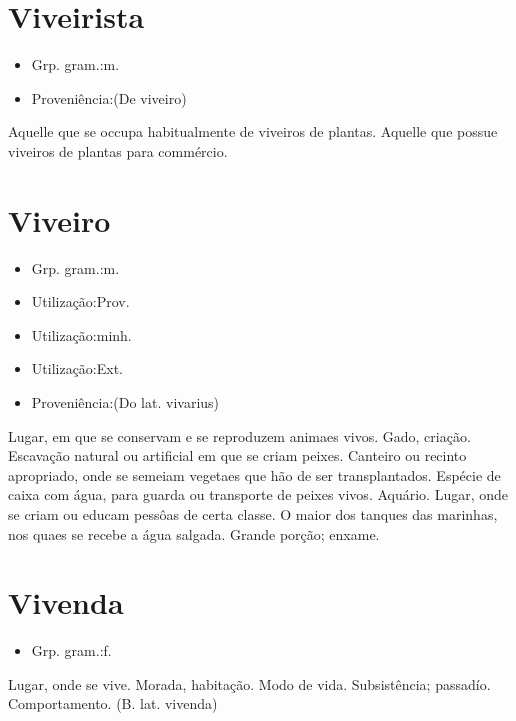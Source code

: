 \documentclass{article}
\begin{document}
\section{Viveirista}
\begin{itemize}
\item {Grp. gram.:m.}
\end{itemize}
\begin{itemize}
\item {Proveniência:(De \textunderscore viveiro\textunderscore )}
\end{itemize}
Aquelle que se occupa habitualmente de viveiros de plantas.
Aquelle que possue viveiros de plantas para commércio.
\section{Viveiro}
\begin{itemize}
\item {Grp. gram.:m.}
\end{itemize}
\begin{itemize}
\item {Utilização:Prov.}
\end{itemize}
\begin{itemize}
\item {Utilização:minh.}
\end{itemize}
\begin{itemize}
\item {Utilização:Ext.}
\end{itemize}
\begin{itemize}
\item {Proveniência:(Do lat. \textunderscore vivarius\textunderscore )}
\end{itemize}
Lugar, em que se conservam e se reproduzem animaes vivos.
Gado, criação.
Escavação natural ou artificial em que se criam peixes.
Canteiro ou recinto apropriado, onde se semeiam vegetaes que hão de ser transplantados.
Espécie de caixa com água, para guarda ou transporte de peixes vivos.
Aquário.
Lugar, onde se criam ou educam pessôas de certa classe.
O maior dos tanques das marinhas, nos quaes se recebe a água salgada.
Grande porção; enxame.
\section{Vivenda}
\begin{itemize}
\item {Grp. gram.:f.}
\end{itemize}
Lugar, onde se vive.
Morada, habitação.
Modo de vida.
Subsistência; passadío.
Comportamento.
(B. lat. \textunderscore vivenda\textunderscore )
\end{document}
